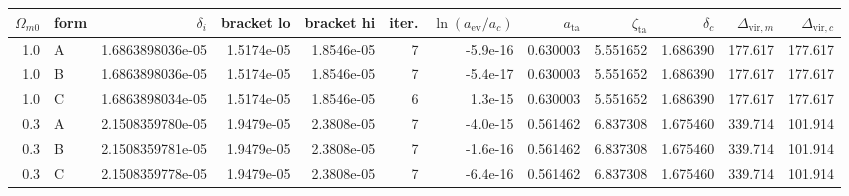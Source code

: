 \begin{tabular}{rlrrrrrrrrrr}
\toprule
$\Omega_{m0}$ & form & $\delta_i$ & bracket lo & bracket hi & iter. & $\ln(a_\mathrm{ev}/a_c)$ & $a_\mathrm{ta}$ & $\zeta_\mathrm{ta}$ & $\delta_c$ & $\Delta_{\mathrm{vir},m}$ & $\Delta_{\mathrm{vir},c}$ \\
\midrule
1.0 & A & 1.6863898036e-05 & 1.5174e-05 & 1.8546e-05 & 7 & -5.9e-16 & 0.630003 & 5.551652 & 1.686390 & 177.617 & 177.617 \\
1.0 & B & 1.6863898036e-05 & 1.5174e-05 & 1.8546e-05 & 7 & -5.4e-17 & 0.630003 & 5.551652 & 1.686390 & 177.617 & 177.617 \\
1.0 & C & 1.6863898034e-05 & 1.5174e-05 & 1.8546e-05 & 6 & 1.3e-15 & 0.630003 & 5.551652 & 1.686390 & 177.617 & 177.617 \\
0.3 & A & 2.1508359780e-05 & 1.9479e-05 & 2.3808e-05 & 7 & -4.0e-15 & 0.561462 & 6.837308 & 1.675460 & 339.714 & 101.914 \\
0.3 & B & 2.1508359781e-05 & 1.9479e-05 & 2.3808e-05 & 7 & -1.6e-16 & 0.561462 & 6.837308 & 1.675460 & 339.714 & 101.914 \\
0.3 & C & 2.1508359778e-05 & 1.9479e-05 & 2.3808e-05 & 7 & -6.4e-16 & 0.561462 & 6.837308 & 1.675460 & 339.714 & 101.914 \\
\bottomrule
\end{tabular}
